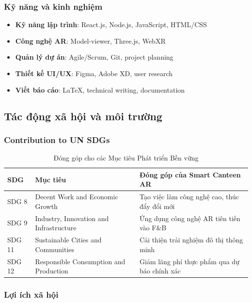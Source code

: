 \documentclass[12pt,a4paper]{article}
\begin{document}
\subsubsection{Kỹ năng và kinh nghiệm}

\begin{itemize}[leftmargin=1cm]
    \item \textbf{Kỹ năng lập trình}: React.js, Node.js, JavaScript, HTML/CSS
    \item \textbf{Công nghệ AR}: Model-viewer, Three.js, WebXR
    \item \textbf{Quản lý dự án}: Agile/Scrum, Git, project planning
    \item \textbf{Thiết kế UI/UX}: Figma, Adobe XD, user research
    \item \textbf{Viết báo cáo}: LaTeX, technical writing, documentation
\end{itemize}

\subsection{Tác động xã hội và môi trường}

\subsubsection{Contribution to UN SDGs}

\begin{table}[H]
\centering
\caption{Đóng góp cho các Mục tiêu Phát triển Bền vững}
\label{tab:sdg-contribution}
\begin{tabular}{@{}>{\raggedright\arraybackslash}p{2cm}>{\raggedright\arraybackslash}p{4cm}>{\raggedright\arraybackslash}p{6cm}@{}}
\toprule
\textbf{SDG} & \textbf{Mục tiêu} & \textbf{Đóng góp của Smart Canteen AR} \\
\midrule
SDG 8 & Decent Work and Economic Growth & Tạo việc làm công nghệ cao, thúc đẩy đổi mới \\
SDG 9 & Industry, Innovation and Infrastructure & Ứng dụng công nghệ AR tiên tiến vào F\&B \\
SDG 11 & Sustainable Cities and Communities & Cải thiện trải nghiệm đô thị thông minh \\
SDG 12 & Responsible Consumption and Production & Giảm lãng phí thực phẩm qua dự báo chính xác \\
\bottomrule
\end{tabular}
\end{table}

\subsubsection{Lợi ích xã hội}
\end{document}
